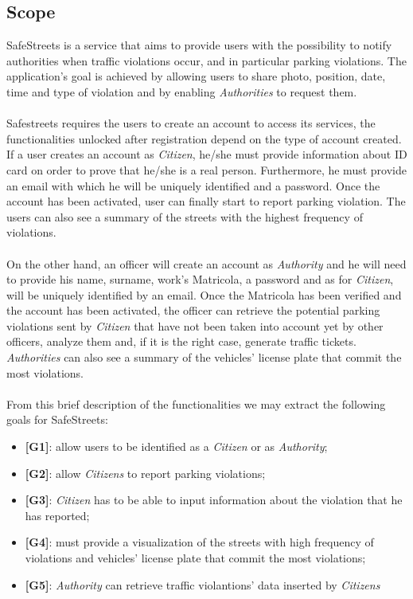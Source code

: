 \documentclass{article}
\begin{document}
\subsection{Scope}
SafeStreets is a service that aims to provide users with the possibility to notify authorities when traffic violations occur, and in particular parking violations. The application's goal is achieved by allowing users to share photo, position, date, time and type of violation and by
enabling \textit{Authorities} to request them.
\\\\Safestreets requires the users to create an account to access its services, the functionalities unlocked after registration depend on the type of account created.
\\If a user creates an account as \textit{Citizen}, he/she must provide information about ID card on order to prove that he/she is a real person. Furthermore, he must provide an email with which he will be uniquely identified and a password.
Once the account has been activated, user can finally start to report parking violation. The users can also see a summary of the streets with the highest frequency of violations.
\\\\On the other hand, an officer will create an account as \textit{Authority} and he will need to provide his name, surname, work's Matricola, a password and as for \textit{Citizen}, will be uniquely identified by an email. Once the Matricola has been verified 
and the account has been activated, the officer can retrieve the potential parking violations sent by \textit{Citizen} that have not been taken into account yet by other officers, analyze them and, if it is the right case, generate traffic tickets.
\textit{Authorities} can also see a summary of the vehicles' license plate that commit the most violations.
\\\\From this brief description of the functionalities we may extract the following goals for SafeStreets:
\begin{itemize}
    \item \textbf{[G1]}: allow users to be identified as a \textit{Citizen} or as \textit{Authority};
    \item \textbf{[G2]}: allow \textit{Citizens} to report parking violations;
    \item \textbf{[G3]}: \textit{Citizen} has to be able to input information about the violation that he has reported;
    \item \textbf{[G4]}: must provide a visualization of the streets with high frequency of violations and vehicles' license plate that commit the most violations;
    \item \textbf{[G5]}: \textit{Authority} can retrieve traffic violantions' data inserted by \textit{Citizens}
\end{itemize}
\end{document}
